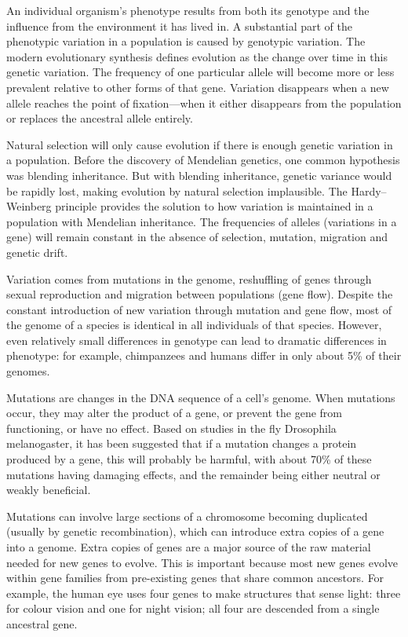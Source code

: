 An individual organism's phenotype results from both its genotype and the influence from the environment it has lived in. A substantial part of the phenotypic variation in a population is caused by genotypic variation. The modern evolutionary synthesis defines evolution as the change over time in this genetic variation. The frequency of one particular allele will become more or less prevalent relative to other forms of that gene. Variation disappears when a new allele reaches the point of fixation---when it either disappears from the population or replaces the ancestral allele entirely.

Natural selection will only cause evolution if there is enough genetic variation in a population. Before the discovery of Mendelian genetics, one common hypothesis was blending inheritance. But with blending inheritance, genetic variance would be rapidly lost, making evolution by natural selection implausible. The Hardy--Weinberg principle provides the solution to how variation is maintained in a population with Mendelian inheritance. The frequencies of alleles (variations in a gene) will remain constant in the absence of selection, mutation, migration and genetic drift.

Variation comes from mutations in the genome, reshuffling of genes through sexual reproduction and migration between populations (gene flow). Despite the constant introduction of new variation through mutation and gene flow, most of the genome of a species is identical in all individuals of that species. However, even relatively small differences in genotype can lead to dramatic differences in phenotype: for example, chimpanzees and humans differ in only about 5\% of their genomes.

Mutations are changes in the DNA sequence of a cell's genome. When mutations occur, they may alter the product of a gene, or prevent the gene from functioning, or have no effect. Based on studies in the fly Drosophila melanogaster, it has been suggested that if a mutation changes a protein produced by a gene, this will probably be harmful, with about 70\% of these mutations having damaging effects, and the remainder being either neutral or weakly beneficial.

Mutations can involve large sections of a chromosome becoming duplicated (usually by genetic recombination), which can introduce extra copies of a gene into a genome. Extra copies of genes are a major source of the raw material needed for new genes to evolve. This is important because most new genes evolve within gene families from pre-existing genes that share common ancestors. For example, the human eye uses four genes to make structures that sense light: three for colour vision and one for night vision; all four are descended from a single ancestral gene.

